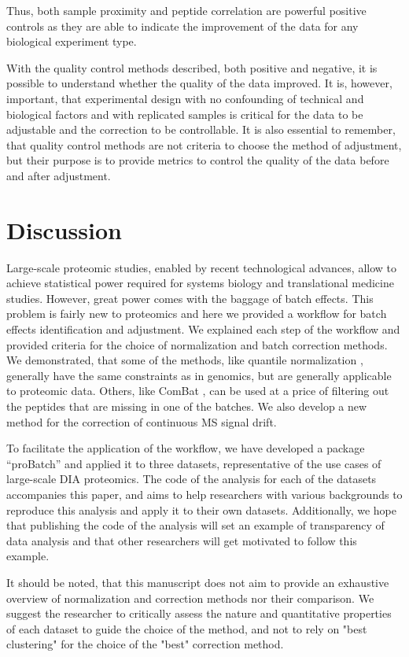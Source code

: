 \documentclass[num-refs]{wiley-article}
\begin{document}
Thus, both sample proximity and peptide correlation are powerful positive controls as they are able to indicate the improvement of the data for any biological experiment type.

With the quality control methods described, both positive and negative, it is possible to understand whether the quality of the data improved. It is, however, important, that experimental design with no confounding of technical and biological factors and with replicated samples is critical for the data to be adjustable and the correction to be controllable. It is also essential to remember, that quality control methods are not criteria to choose the method of adjustment, but their purpose is to provide metrics to control the quality of the data before and after adjustment.

\section{Discussion}
Large-scale proteomic studies, enabled by recent technological advances, allow to achieve statistical power required for systems biology and translational medicine studies. However, great power comes with the baggage of batch effects. This problem is fairly new to proteomics and here we provided a workflow for batch effects identification and adjustment. We explained each step of the workflow and provided criteria for the choice of normalization and batch correction methods. We demonstrated, that some of the methods, like quantile normalization \cite{Bolstad2003}, generally have the same constraints as in genomics, but are generally applicable to proteomic data. Others, like ComBat \cite{Johnson:2007aa}, can be used at a price of filtering out the peptides that are missing in one of the batches. We also develop a new method for the correction of continuous MS signal drift.

To facilitate the application of the workflow, we have developed a package “proBatch” and applied it to three datasets, representative of the use cases of large-scale DIA proteomics. The code of the analysis for each of the datasets accompanies this paper, and aims to help researchers with various backgrounds to reproduce this analysis and apply it to their own datasets. Additionally, we hope that publishing the code of the analysis will set an example of transparency of data analysis and that other researchers will get motivated to follow this example.

It should be noted, that this manuscript does not aim to provide an exhaustive overview of normalization and correction methods nor their comparison. We suggest the researcher to critically assess the nature and quantitative properties of each dataset to guide the choice of the method, and not to rely on "best clustering" for the choice of the "best" correction method.
\end{document}
